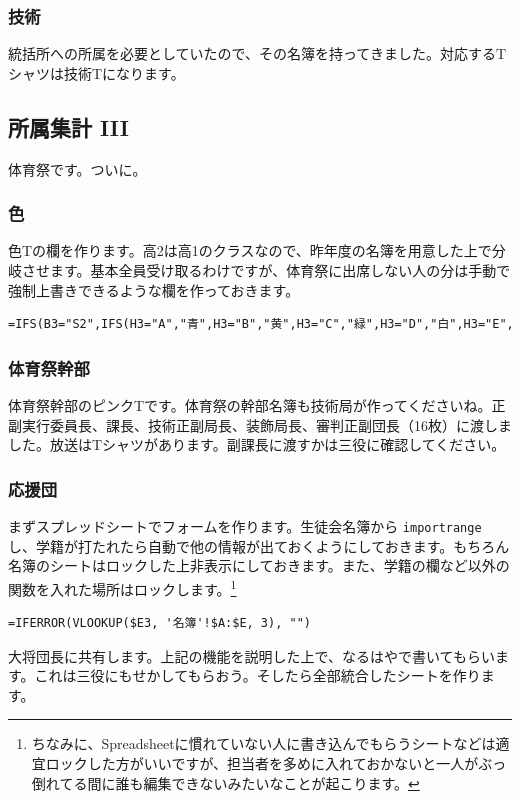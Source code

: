 \documentclass[dvipdfmx,jb5]{jreport}
\begin{document}
\subsubsection{技術}
統括所への所属を必要としていたので、その名簿を持ってきました。対応するTシャツは技術Tになります。

\subsection{所属集計 III}
体育祭です。ついに。

\subsubsection{色}
色Tの欄を作ります。高2は高1のクラスなので、昨年度の名簿を用意した上で分岐させます。基本全員受け取るわけですが、体育祭に出席しない人の分は手動で強制上書きできるような欄を作っておきます。
\\
\begin{lstlisting}
=IFS(B3="S2",IFS(H3="A","青",H3="B","黄",H3="C","緑",H3="D","白",H3="E","赤"),B3<>"S2",I3)
\end{lstlisting}

\subsubsection{体育祭幹部}
体育祭幹部のピンクTです。体育祭の幹部名簿も技術局が作ってくださいね。正副実行委員長、課長、技術正副局長、装飾局長、審判正副団長（16枚）に渡しました。放送はTシャツがあります。副課長に渡すかは三役に確認してください。

\subsubsection{応援団}
まずスプレッドシートでフォームを作ります。生徒会名簿から \texttt{importrange} し、学籍が打たれたら自動で他の情報が出ておくようにしておきます。もちろん名簿のシートはロックした上非表示にしておきます。また、学籍の欄など以外の関数を入れた場所はロックします。\footnote{ちなみに、Spreadsheetに慣れていない人に書き込んでもらうシートなどは適宜ロックした方がいいですが、担当者を多めに入れておかないと一人がぶっ倒れてる間に誰も編集できないみたいなことが起こります。}

\begin{lstlisting}
=IFERROR(VLOOKUP($E3, '名簿'!$A:$E, 3), "")
\end{lstlisting}

大将団長に共有します。上記の機能を説明した上で、なるはやで書いてもらいます。これは三役にもせかしてもらおう。そしたら全部統合したシートを作ります。
\end{document}
